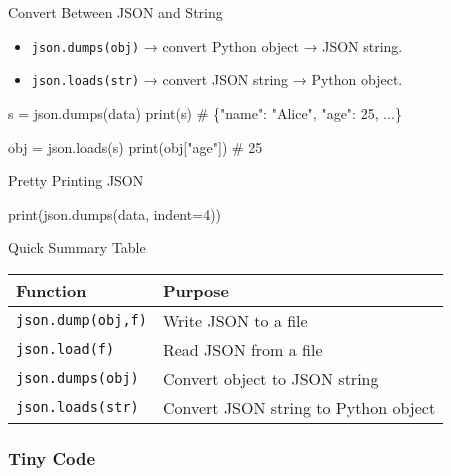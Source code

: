 \documentclass[
  letterpaper,
  DIV=11,
  numbers=noendperiod]{scrreprt}
\newenvironment{Shaded}{\begin{snugshade}}{\end{snugshade}}
\newcommand{\BuiltInTok}[1]{\textcolor[rgb]{0.00,0.23,0.31}{#1}}
\newcommand{\CommentTok}[1]{\textcolor[rgb]{0.37,0.37,0.37}{#1}}
\newcommand{\DecValTok}[1]{\textcolor[rgb]{0.68,0.00,0.00}{#1}}
\newcommand{\NormalTok}[1]{\textcolor[rgb]{0.00,0.23,0.31}{#1}}
\newcommand{\OperatorTok}[1]{\textcolor[rgb]{0.37,0.37,0.37}{#1}}
\newcommand{\StringTok}[1]{\textcolor[rgb]{0.13,0.47,0.30}{#1}}
\providecommand{\tightlist}{%
  \setlength{\itemsep}{0pt}\setlength{\parskip}{0pt}}
\begin{document}
Convert Between JSON and String

\begin{itemize}
\tightlist
\item
  \texttt{json.dumps(obj)} → convert Python object → JSON string.
\item
  \texttt{json.loads(str)} → convert JSON string → Python object.
\end{itemize}

\begin{Shaded}
\begin{Highlighting}[]
\NormalTok{s }\OperatorTok{=}\NormalTok{ json.dumps(data)}
\BuiltInTok{print}\NormalTok{(s)   }\CommentTok{\# \textquotesingle{}\{"name": "Alice", "age": 25, ...\}\textquotesingle{}}

\NormalTok{obj }\OperatorTok{=}\NormalTok{ json.loads(s)}
\BuiltInTok{print}\NormalTok{(obj[}\StringTok{"age"}\NormalTok{])   }\CommentTok{\# 25}
\end{Highlighting}
\end{Shaded}

Pretty Printing JSON

\begin{Shaded}
\begin{Highlighting}[]
\BuiltInTok{print}\NormalTok{(json.dumps(data, indent}\OperatorTok{=}\DecValTok{4}\NormalTok{))}
\end{Highlighting}
\end{Shaded}

Quick Summary Table

\begin{longtable}[]{@{}ll@{}}
\toprule\noalign{}
Function & Purpose \\
\midrule\noalign{}
\endhead
\bottomrule\noalign{}
\endlastfoot
\texttt{json.dump(obj,f)} & Write JSON to a file \\
\texttt{json.load(f)} & Read JSON from a file \\
\texttt{json.dumps(obj)} & Convert object to JSON string \\
\texttt{json.loads(str)} & Convert JSON string to Python object \\
\end{longtable}

\subsubsection{Tiny Code}\label{tiny-code-57}
\end{document}

